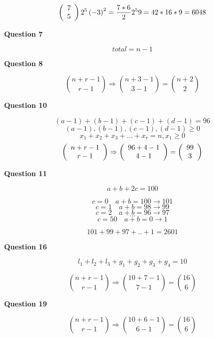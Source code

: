\documentclass[11pt]{article}
\begin{document}
$$ \left( {\begin{array}{*{20}c} 7 \\ 5 \\ \end{array}} \right)2^5\left(-3\right)^2 = \frac{7*6}{2} 2^5  9 = 42 * 16 * 9 = {6048} $$

\textbf{Question 7}

$$total = n-1$$

\textbf{Question 8 }

$$ {n+r-1 \choose r-1} \Rightarrow {n+3-1 \choose 3-1} = {n+2 \choose 2} $$ 

\textbf{Question 10}

$$\left(a-1\right)+\left(b-1\right)+\left(c-1\right)+\left(d-1\right) = 96 $$
$$\left(a-1\right),\left(b-1\right),\left(c-1\right),\left(d-1\right) \geq 0$$
$$x_1 + x_2 + x_3 + ... + x_r = n , x_1 \geq 0$$ 
$$\left( {\begin{array}{*{20}c} n+r-1 \\ r-1 \\ \end{array}} \right) \Rightarrow \left( {\begin{array}{*{20}c} 96+4-1 \\ 4-1 \\ \end{array}} \right) = \left( {\begin{array}{*{20}c} 99 \\ 3 \\ \end{array}} \right)$$

\textbf{Question 11}
 
 $$a+b+2c = 100$$

 $$c=0  \quad  a+b=100 \rightarrow 101 $$
 $$c=1  \quad  a+b=98  \rightarrow 99 $$
 $$c=2  \quad  a+b=96  \rightarrow 97 $$
 $$...$$
 $$c=50 \quad  a+b=0   \rightarrow 1  $$

 $$101+99+97+..+1 = 2601$$
 
\textbf{Question 16}

$$l_1 + l_2 + l_3 + g_1 + g_2 + g_3 + g_4 = 10$$

$${n+r-1 \choose r-1} \Rightarrow {10+7-1 \choose 7-1} = {16 \choose 6}$$ 
 
 
\textbf{Question 19}

$${n+r-1 \choose r-1} \Rightarrow {10+6-1 \choose 6-1} = {16 \choose 6}$$ 
 
\end{document}
